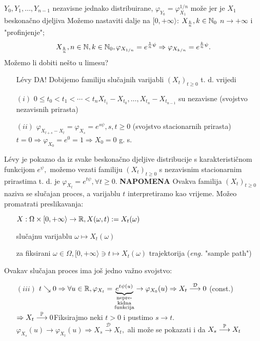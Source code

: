\documentclass{article}
\begin{document}
\(Y_0,Y_1,\ldots,Y_{n-1}\) nezavisne jednako distribuirane, \(\varphi_{Y_0}=\varphi_{X_1}^{1/n}\)  može jer je \(X_1\) beskonačno djeljiva \newline Možemo nastaviti dalje na \([0,+\infty\rangle\): \(X_{\frac{k}n},k\in\Bbb N_0\)  \(n\to+\infty\) i "profinjenje"; \[X_{\frac{k}n},n\in\Bbb N,k\in\Bbb N_0,\varphi_{X_{1/n}}=e^{\frac1n\psi}\Rightarrow\varphi_{X_{k/n}}=e^{\frac{k}n\psi}.\] Možemo li dobiti nešto u limesu? \begin{enumerate}
    \item[\ding{228}] L\'evy  DA! Dobijemo familiju slučajnih varijabli \((X_t)_{t\ge0}\) t. d. vrijedi
    \item[\((i)\)] \(0\le t_0<t_1<\cdots<t_n\)\newline \(X_{t_1}-X_{t_0},\ldots,X_{t_n}-X_{t_{n-1}}\) su nezavisne (svojstvo nezavisnih prirasta)
    \item[\((ii)\)] \(\varphi_{X_{t+s}-X_t}=\varphi_{X_s}=e^{s\psi},s,t\ge0\) (svojstvo stacionarnih prirasta)\newline \(t=0\Rightarrow\varphi_{X_0}=e^0=1\Rightarrow X_0=0\) g. s.
\end{enumerate}
L\'evy je pokazao da iz svake beskonačno djeljive distribucije s karakterističnom funkcijom \(e^\psi,\) možemo vezati familiju \((X_t)_{t\ge0}\) s nezavisnim stacionarnim prirastima t. d. je \(\varphi_{X_t}=e^{t\psi},\forall t\ge0.\)\newline\newline
{}\textbf{NAPOMENA}\newline
Ovakva familija \((X_t)_{t\ge0}\) naziva se slučajan proces, a varijablu \(t\) interpretiramo kao vrijeme. Možeo promatrati preslikavanja:
\begin{enumerate}
    \item[\ding{228}] \(X:\Omega\times[0,+\infty\rangle\to\Bbb R,X(\omega,t):=X_t(\omega)\)
    \item[\ding{228}] slučajnu varijablu \(\omega\mapsto X_t(\omega)\)
    \item[\ding{228}] za fiksirani \(\omega\in\Omega, [0,+\infty\rangle\ni t\mapsto X_t(\omega)\)  trajektorija (\textit{eng.} "sample path")
\end{enumerate}
Ovakav slučajan proces ima još jedno važno svojstvo:
\begin{enumerate}
    \item[\((iii)\)] \(t\searrow 0\Rightarrow\forall u\in\Bbb R,\varphi_{X_t}=\underbrace{e^{t\psi(u)}}_{\substack{\text{nepre-}\\\text{kidna}\\\text{funkcija}}}\to\varphi_{X_0}(u)\Rightarrow X_t\overset{\mathcal D}{\longrightarrow}0\) (const.) \(\Rightarrow X_t\overset{\Bbb P}{\longrightarrow}0\)\newline Fiksirajmo neki \(t>0\) i pustimo \(s\to t.\) \(\varphi_{X_s}(u)\to\varphi_{X_t}(u)\Rightarrow X_s\overset{\mathcal D}{\longrightarrow}X_t,\) ali može se pokazati i da \(X_s\overset{\Bbb P}{\longrightarrow}X_t\) 
\end{enumerate}
\end{document}
